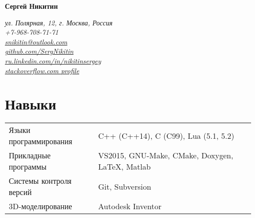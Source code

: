 \documentclass[a4paper, 11pt]{article}
\begin{document}
{\LARGE\textbf{Сергей Никитин}}

\begin{flushright}
    {\itshape
        ул. Полярная, 12, г. Москва, Россия                                                     \\
        +7-968-708-71-71                                                                        \\
        \href{mailto:snikitin@outlook.com}{snikitin@outlook.com}                                \\
        \href{https://github.com/SergNikitin}{github.com/SergNikitin}                           \\
        \href{http://ru.linkedin.com/in/nikitinsergey}{ru.linkedin.com/in/nikitinsergey}        \\
        \href{http://stackoverflow.com/users/3375765/sergey-nikitin}{stackoverflow.com profile} \\
    }
\end{flushright}

\section{Навыки}
\begin{tabular}{ll}
    Языки программирования   & C++ (C++14), C (C99), Lua (5.1, 5.2)            \\
    Прикладные программы     & VS2015, GNU-Make, CMake, Doxygen, LaTeX, Matlab \\
    Системы контроля версий  & Git, Subversion                                 \\
    3D-моделирование         & Autodesk Inventor
\end{tabular}
\end{document}
